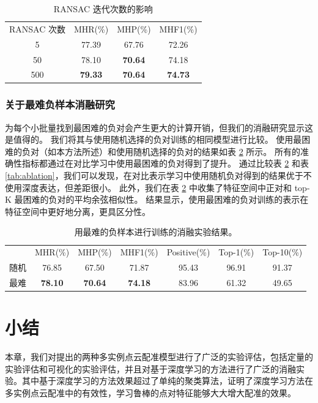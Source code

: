 \begin{table}
  \caption{
        RANSAC 迭代次数的影响
  }
  \centering
  \begin{tabular}{cccc}
    \hline\noalign{\smallskip}
    RANSAC 次数 & MHR(\%)         & MHP(\%)         & MHF1(\%)          \\
  \noalign{\smallskip}
  \hline
  \noalign{\smallskip}
  5   & 77.39          & 67.76          & 72.26              \\
  50  & 78.10          & \textbf{70.64} & 74.18                \\
  500 & \textbf{79.33} & \textbf{70.64} & \textbf{74.73}  \\  
  \hline
  \end{tabular}
  \label{tab:ransac}
\end{table}

\subsubsection{关于最难负样本消融研究}
\vspace{-0.3cm}
为每个小批量找到最困难的负对会产生更大的计算开销，但我们的消融研究显示这是值得的。
我们将其与使用随机选择的负对训练的相同模型进行比较。
使用最困难的负对（如本方法所述）和使用随机选择的负对的结果如表 \ref{tab:hardest} 所示。
所有的准确性指标都通过在对比学习中使用最困难的负对得到了提升。
通过比较表 \ref{tab:hardest} 和表 \ref{tab:ablation}，我们可以发现，在对比表示学习中使用随机负对得到的结果优于不使用深度表达，但差距很小。
此外，我们在表 \ref{tab:hardest} 中收集了特征空间中正对和 top-K 最困难的负对的平均余弦相似性。
结果显示，使用最困难的负对训练的表示在特征空间中更好地分离，更具区分性。

\begin{table}
  \caption{
        用最难的负样本进行训练的消融实验结果。
  }
  \centering
  \begin{tabular}{ccccccc}
    \hline\noalign{\smallskip}
    & MHR(\%) & MHP(\%) & MHF1(\%) & Positive(\%) & Top-1(\%) & Top-10(\%) \\
    \noalign{\smallskip}
    \hline
    \noalign{\smallskip}
    随机  & 76.85  & 67.50  & 71.87  & 95.43 & 96.91 & 91.37  \\
    最难 & \textbf{78.10} & \textbf{70.64} & \textbf{74.18} & 83.96 & 61.32 & 49.65 \\  
    \hline
  \end{tabular}
  \label{tab:hardest}
\end{table}


\section{小结}
本章，我们对提出的两种多实例点云配准模型进行了广泛的实验评估，包括定量的实验评估和可视化的实验评估，并且对基于深度学习的方法进行了广泛的消融实验。其中基于深度学习的方法效果超过了单纯的聚类算法，证明了深度学习方法在多实例点云配准中的有效性，学习鲁棒的点对特征能够大大增大配准的效果。
